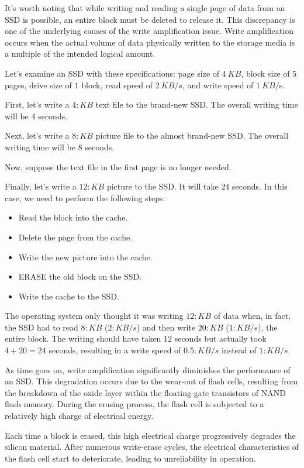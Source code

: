 It's worth noting that while writing and reading a single page of data from an SSD is possible, an entire block must be deleted to release it.
This discrepancy is one of the underlying causes of the write amplification issue. 
Write amplification occurs when the actual volume of data physically written to the storage media is a multiple of the intended logical amount.
\begin{example}
    Let's examine an SSD with these specifications: page size of $4\:KB$, block size of $5$ pages, drive size of $1$ block, read speed of $2\:KB/s$, and write speed of $1\:KB/$s.
    
    First, let's write a $4:KB$ text file to the brand-new SSD.\@
    The overall writing time will be $4$ seconds.

    Next, let's write a $8:KB$ picture file to the almost brand-new SSD.\@
    The overall writing time will be $8$ seconds.

    Now, suppose the text file in the first page is no longer needed.

    Finally, let's write a $12:KB$ picture to the SSD.\@
    It will take $24$ seconds. 
    In this case, we need to perform the following steps:
    \begin{itemize}
        \item Read the block into the cache.
        \item Delete the page from the cache.
        \item Write the new picture into the cache.
        \item ERASE the old block on the SSD.\@
        \item Write the cache to the SSD.\@
    \end{itemize}
    The operating system only thought it was writing $12:KB$ of data when, in fact, the SSD had to read $8:KB$ ($2:KB/s$) and then write $20:KB$ ($1:KB/s$), the entire block.
    The writing should have taken $12$ seconds but actually took $4 + 20 = 24$ seconds, resulting in a write speed of $0.5:KB/s$ instead of $1:KB/s$.
\end{example}
As time goes on, write amplification significantly diminishes the performance of an SSD.\@ 
This degradation occurs due to the wear-out of flash cells, resulting from the breakdown of the oxide layer within the floating-gate transistors of NAND flash memory. 
During the erasing process, the flash cell is subjected to a relatively high charge of electrical energy.

Each time a block is erased, this high electrical charge progressively degrades the silicon material. 
After numerous write-erase cycles, the electrical characteristics of the flash cell start to deteriorate, leading to unreliability in operation.

